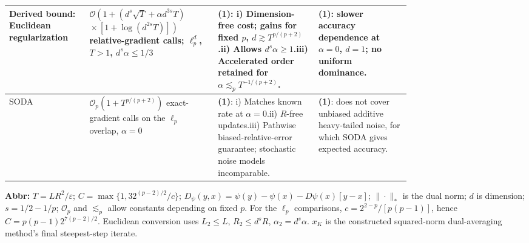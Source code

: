 \begin{table}[tp]
\begin{threeparttable}
\begin{tabularx}{\linewidth}{@{}>{\raggedright\arraybackslash}p{0.20\linewidth}>{\raggedright\arraybackslash}p{0.32\linewidth}>{\raggedright\arraybackslash}p{0.25\linewidth}>{\raggedright\arraybackslash}X@{}}
\midrule
Derived bound: Euclidean regularization \citep[Thm.~7.2]{vasinGasnikov2026CompositeV1}
& $\mathcal{O}\!\left(1+(d^s\sqrt{T}+\alpha d^{3s}T)\right.$\newline $\left.{}\times[1+\log(d^{2s}T)]\right)$ relative-gradient calls; $\ell_p^d$, $T>1$, $d^s\alpha\le1/3$
& \textbf{(1)}: i) Dimension-free cost; gains for fixed $p$, $d\gtrsim T^{p/(p+2)}$.\newline ii) Allows $d^s\alpha\ge1$.\newline iii) Accelerated order retained for $\alpha\lesssim_p T^{-1/(p+2)}$.
& \textbf{(1)}: slower accuracy dependence at $\alpha=0$, $d=1$; no uniform dominance. \\
\midrule
SODA \citep[Cor.~3.2]{pgrPethick2026v1}
& $\mathcal{O}_p\!\left(1+T^{p/(p+2)}\right)$ exact-gradient calls on the $\ell_p$ overlap, $\alpha=0$
& \textbf{(1)}: i) Matches known rate at $\alpha=0$.\newline ii) $R$-free updates.\newline iii) Pathwise biased-relative-error guarantee; stochastic noise models incomparable.
& \textbf{(1)}: does not cover unbiased additive heavy-tailed noise, for which SODA gives expected accuracy. \\
\bottomrule
\end{tabularx}
\begin{tablenotes}[flushleft]\footnotesize
\item[] \textbf{Abbr:} $T=LR^2/\varepsilon$; $C=\max\{1,32^{(p-2)/2}/c\}$; $D_\psi(y,x)=\psi(y)-\psi(x)-D\psi(x)[y-x]$; $\|\cdot\|_*$ is the dual norm; $d$ is dimension; $s=1/2-1/p$; $\mathcal{O}_p$ and $\lesssim_p$ allow constants depending on fixed $p$. For the $\ell_p$ comparisons, $c=2^{2-p}/[p(p-1)]$, hence $C=p(p-1)2^{7(p-2)/2}$. Euclidean conversion uses $L_2\le L$, $R_2\le d^sR$, $\alpha_2=d^s\alpha$. $x_K$ is the constructed squared-norm dual-averaging method's final steepest-step iterate.
\end{tablenotes}
\end{threeparttable}
\end{table}
\clearpage
